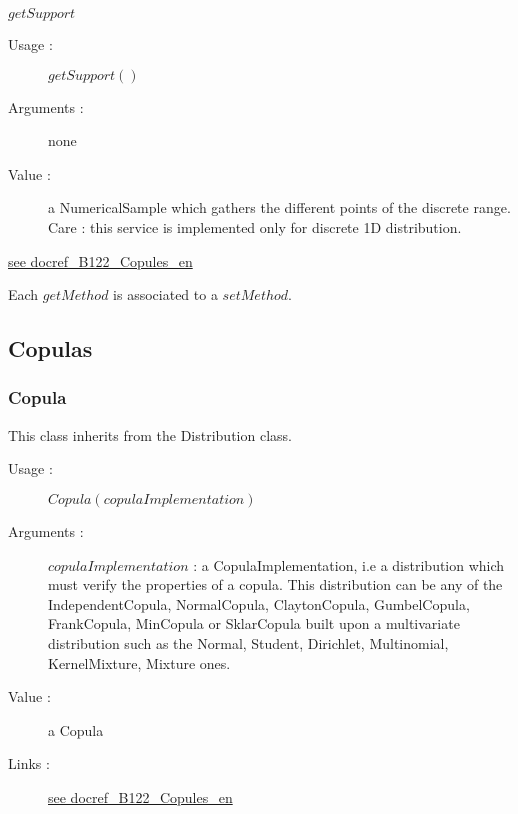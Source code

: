 \begin{description}
\begin{description}
  \item $getSupport$
    \begin{description}
    \item[Usage :] $getSupport()$
    \item[Arguments :] none
    \item[Value :] a NumericalSample which gathers the different points of the discrete range. Care : this service is implemented only for discrete 1D distribution.
    \end{description}


  \end{description}





\item[Links :]  \rule{0pt}{1em}
  \href{./Version/docref_B122_Copules_en.pdf}{see docref\_B122\_Copules\_en}
\end{description}

Each  $getMethod$  is associated to a $setMethod$.


\newpage \subsection{Copulas}

\subsubsection{Copula}


This class inherits from the Distribution class.

\begin{description}

\item[Usage :] $Copula(copulaImplementation)$

\item[Arguments :]  $copulaImplementation$        : a CopulaImplementation, i.e a distribution which must verify the properties of a copula. This distribution can be any of the IndependentCopula, NormalCopula, ClaytonCopula, GumbelCopula, FrankCopula, MinCopula or SklarCopula built upon a multivariate distribution such as the Normal, Student, Dirichlet, Multinomial, KernelMixture, Mixture ones.

\item[Value :] a Copula

\item[Links :]  \rule{0pt}{1em}
  \href{./Version/docref_B122_Copules_en.pdf}{see docref\_B122\_Copules\_en}
\end{description}

